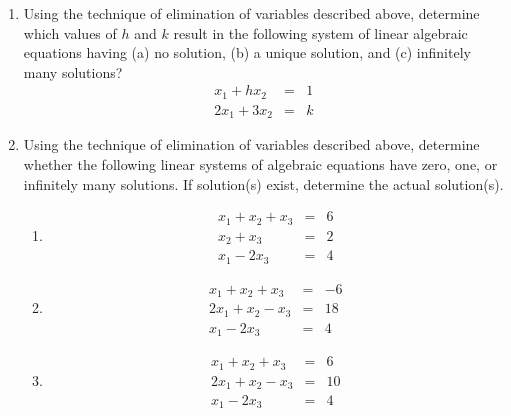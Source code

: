 \begin{prob}
\begin{enumerate}
\item Using the technique of elimination of variables described above, determine which values of $h$ and $k$ result in the following system of linear algebraic equations having (a) no solution, (b) a unique solution, and (c) infinitely many solutions?
\begin{eqnarray*}
x_1 + h x_2 &=& 1 \\
2 x_1 + 3 x_2 &=& k
\end{eqnarray*}

\item Using the technique of elimination of variables described above, determine whether the following linear systems of algebraic equations have zero, one, or infinitely many solutions. If solution(s) exist, determine the actual solution(s).

\begin{enumerate}

\item
\begin{eqnarray*}
x_1 + x_2 + x_3 &=& 6 \\
x_2 + x_3 &=&  2 \\
x_1 - 2 x_3 &=& 4
\end{eqnarray*}

\item
\begin{eqnarray*}
x_1 + x_2 + x_3 &=& -6 \\
2x_1 + x_2 - x_3 &=&  18 \\
x_1 - 2 x_3 &=& 4
\end{eqnarray*}

\item
\begin{eqnarray*}
x_1 + x_2 + x_3 &=& 6 \\
2x_1 + x_2 - x_3 &=&  10 \\
x_1 - 2 x_3 &=& 4
\end{eqnarray*}

\end{enumerate}

\end{enumerate}
\end{prob}
